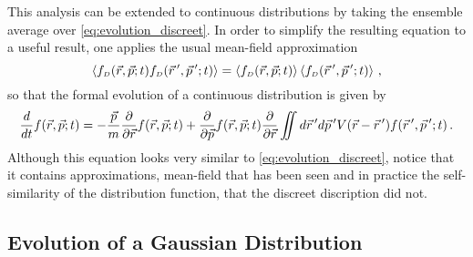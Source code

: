 This analysis can be extended to continuous distributions by taking the ensemble average over \ref{eq:evolution_discreet}.
In order to simplify the resulting equation to a useful result, one applies the usual mean-field approximation
\begin{equation}
  \left < f_{{\scriptscriptstyle D}} (\vec{r}, \vec{p}; t) f_{{\scriptscriptstyle D}} (\vec{r}\,^{\prime}, \vec{p}\,^{\prime}; t) \right > = \left < f_{{\scriptscriptstyle D}} (\vec{r}, \vec{p}; t) \right > \left < f_{{\scriptscriptstyle D}} (\vec{r}\,^{\prime}, \vec{p}\,^{\prime}; t) \right > \,\text{,}
\end{equation}
so that the formal evolution of a continuous distribution is given by
\begin{equation} \label{eq:formal_evolution}
  \frac{d}{dt} f(\vec{r}, \vec{p}; t) =
  -\frac{\vec{p}}{m} \frac{\partial}{\partial \vec{r}} f(\vec{r}, \vec{p}; t)
  + \frac{\partial}{\partial \vec{p}} f (\vec{r}, \vec{p}; t)
  \frac{\partial}{\partial \vec{r}} \iint d\vec{r}\,^{\prime} d\vec{p}\,^{\prime} V(\vec{r} - \vec{r}\,^{\prime}) f(\vec{r}\,^{\prime},\vec{p}\,^{\prime};t) \,\text{.}
\end{equation}
Although this equation looks very similar to \ref{eq:evolution_discreet}, notice that it contains approximations, mean-field that has been seen and in practice the self-similarity of the distribution function, that the discreet discription did not.

\subsection{Evolution of a Gaussian Distribution}

